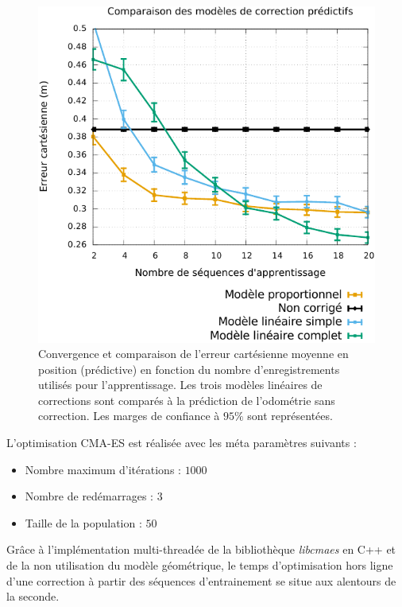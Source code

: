 \begin{figure}[htb]
    \centerfloat
    \includegraphics[type=pdf,ext=.pdf,read=.pdf,width=0.8\linewidth]{../plot/OdometryCMAES/convergenceOrders}
    \caption{\label{fig:odometry_cmaes_convergence_orders} 
        Convergence et comparaison de l'erreur cartésienne moyenne en position (prédictive)
        en fonction du nombre d'enregistrements utilisés pour l'apprentissage.
        Les trois modèles linéaires de corrections sont comparés à la prédiction
        de l'odométrie sans correction.
        Les marges de confiance à $95\%$ sont représentées.
    }
\end{figure}

L'optimisation CMA-ES est réalisée avec les méta paramètres suivants :
\begin{itemize}
    \item Nombre maximum d'itérations : $1000$
    \item Nombre de redémarrages : $3$
    \item Taille de la population : $50$
\end{itemize}
Grâce à l'implémentation multi-threadée de la bibliothèque \textit{libcmaes} en C++ et
de la non utilisation du modèle géométrique,
le temps d'optimisation hors ligne d'une correction à partir 
des séquences d'entrainement se situe aux alentours de la seconde.

